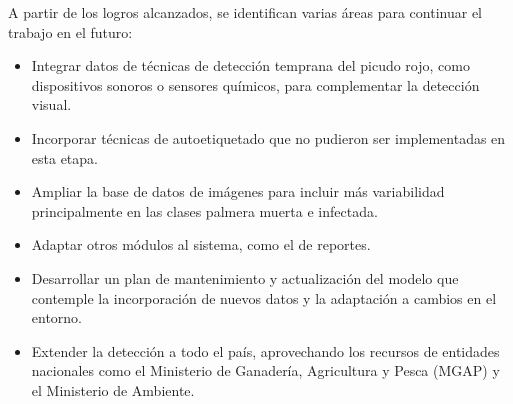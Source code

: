 A partir de los logros alcanzados, se identifican varias áreas para continuar el trabajo en el futuro:

\begin{itemize}
    \item Integrar datos de técnicas de detección temprana del picudo rojo, como dispositivos sonoros o sensores químicos, para complementar la detección visual.
    \item Incorporar técnicas de autoetiquetado que no pudieron ser implementadas en esta etapa.
    \item Ampliar la base de datos de imágenes para incluir más variabilidad principalmente en las clases palmera muerta e infectada.
    \item Adaptar otros módulos al sistema, como el de reportes.
    \item Desarrollar un plan de mantenimiento y actualización del modelo que contemple la incorporación de nuevos datos y la adaptación a cambios en el entorno.
    \item Extender la detección a todo el país, aprovechando los recursos de entidades nacionales como el Ministerio de Ganadería, Agricultura y Pesca (MGAP) y el Ministerio de Ambiente.
\end{itemize}
